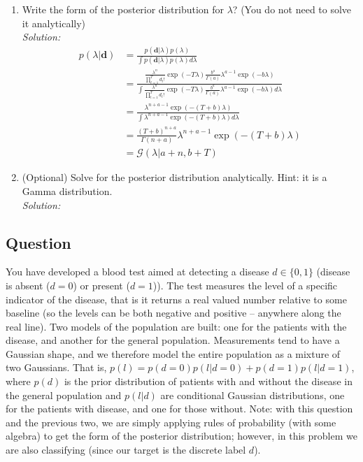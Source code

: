 \documentclass[12pt,a4paper]{article}
\begin{document}
\begin{enumerate}
  \item Write the form of the posterior distribution for $\lambda$? (You do not need to solve it analytically) \\
	  \emph{Solution:} \\
		  \begin{align*}
		  p(\lambda \vert \textbf{d}) &= \frac{p(\textbf{d}\vert \lambda)p(\lambda)}{\int p(\textbf{d}\vert \lambda)p(\lambda)d\lambda} \\
		  &= \frac{\frac{\lambda^n}{\prod_{t=1}^{T}d_t!} \exp(-T\lambda)\frac{b^a}{\Gamma(a)}\lambda^{a-1} \exp(-b\lambda)}{\int \frac{\lambda^n}{\prod_{t=1}^{T}d_t!}\exp(-T\lambda)\frac{b^a}{\Gamma(a)}\lambda^{a-1} \exp(-b\lambda)d\lambda}\\ 
		  &=\frac{\lambda^{n+a-1}\exp(-(T + b)\lambda)}{\int\lambda^{n+a-1}\exp(-(T + b)\lambda)d\lambda} \\
		  &=\frac{(T+b)^{n+a}}{\Gamma(n+a)}\lambda^{n+a-1}\exp(-(T + b)\lambda)\\
		  &= \mathcal{G}(\lambda \vert a + n, b + T)
		  \end{align*}
  
  
  \item (Optional) Solve for the posterior distribution analytically.  Hint: it is a Gamma distribution. \\
	  \emph{Solution:} \\
  
\end{enumerate}

\subsection{Question}
You have developed a blood test aimed at detecting a disease $d \in \{0,1\}$ (disease is absent ($d=0$) or present ($d=1$)).  The test measures the level of a specific indicator of the disease, that is it returns a real valued number relative to some baseline (so the levels can be both negative and positive -- anywhere along the real line).  Two models of the population are built: one for the patients with the disease, and another for the general population.  Measurements tend to have a Gaussian shape, and we therefore model the entire population as a mixture of two Gaussians.  That is, $p( l ) = p(d=0) p( l | d=0 ) + p(d=1) p( l | d=1 )$, where $p(d)$ is the prior distribution of patients with and without the disease in the general population and $p(l|d)$  are conditional Gaussian distributions, one for the patients with disease, and one for those without.  Note: with this question and the previous two, we are simply applying rules of probability (with some algebra) to get the form of the posterior distribution; however, in this problem we are also classifying (since our target is the discrete label $d$).
\end{document}

